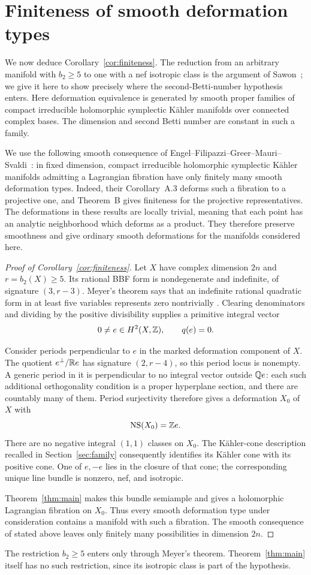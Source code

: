 \section{Finiteness of smooth deformation types}
\label{sec:finiteness}

We now deduce Corollary~\ref{cor:finiteness}. The reduction from an
arbitrary manifold with $b_2\ge5$ to one with a nef isotropic class is
the argument of Sawon~\cite[Proposition~4.3]{Sawon}; we give it here
to show precisely where the second-Betti-number hypothesis enters.
Here deformation
equivalence is generated by smooth proper families of compact
irreducible holomorphic symplectic K\"ahler manifolds over connected
complex bases. The dimension and second Betti number are constant
in such a family.

We use the following smooth consequence of
Engel--Filipazzi--Greer--Mauri--Svaldi~\cite[Theorem~B and
Corollary~A.3]{EFGMS}: in fixed dimension, compact irreducible
holomorphic symplectic K\"ahler manifolds admitting a Lagrangian
fibration have only finitely many smooth deformation types.
Indeed, their Corollary~A.3 deforms such a fibration to a projective
one, and Theorem~B gives finiteness for the projective representatives.
The deformations in these results are locally trivial, meaning
that each point has an analytic neighborhood which deforms as a
product. They therefore preserve smoothness and give ordinary
smooth deformations for the manifolds considered here.

\begin{proof}[Proof of Corollary~\ref{cor:finiteness}]
Let $X$ have complex dimension $2n$ and $r=b_2(X)\ge5$.
Its rational BBF form is nondegenerate and indefinite, of signature
$(3,r-3)$. Meyer's theorem says that an indefinite rational quadratic
form in at least five variables represents zero nontrivially
\cite[Chapter~IV, \S3.2, Corollary~2]{SerreArithmetic}. Clearing denominators and dividing by the positive
divisibility supplies a primitive integral vector
\[
             0\ne e\in H^2(X,\mathbb Z),\qquad q(e)=0.
\]

Consider periods perpendicular to $e$ in the marked deformation
component of $X$. The quotient $e^\perp/\mathbb R e$ has signature
$(2,r-4)$, so this period locus is nonempty. A generic period in
it is perpendicular to no integral vector outside $\mathbb Q e$:
each such additional orthogonality condition is a proper
hyperplane section, and there are countably many of them.
Period surjectivity therefore gives a deformation $X_0$ of $X$
with
\[
                       \operatorname{NS}(X_0)=\mathbb Z e.
\]
There are no negative integral $(1,1)$ classes on $X_0$.
The K\"ahler-cone description recalled in
Section~\ref{sec:family} consequently identifies its K\"ahler cone
with its positive cone. One of $e,-e$ lies in the closure of
that cone; the corresponding unique line bundle is nonzero,
nef, and isotropic.

Theorem~\ref{thm:main} makes this bundle semiample and gives a
holomorphic Lagrangian fibration on $X_0$. Thus every smooth
deformation type under consideration contains a manifold with
such a fibration. The smooth consequence of
\cite[Theorem~B and Corollary~A.3]{EFGMS} stated above leaves
only finitely many possibilities in dimension $2n$.
\end{proof}

The restriction $b_2\ge5$ enters only through Meyer's theorem.
Theorem~\ref{thm:main} itself has no such restriction, since its
isotropic class is part of the hypothesis.
